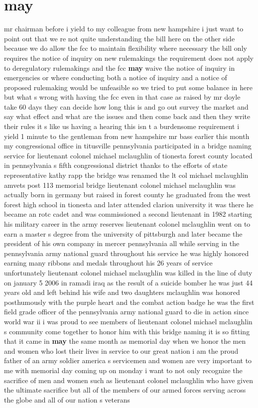 \documentclass{article}
\begin{document}
\section*{may}
mr chairman before i yield to my colleague from new hampshire i just want to point out that we re not quite understanding the bill here on the other side because we do allow the fcc to maintain flexibility where necessary the bill only requires the notice of inquiry on new rulemakings the requirement does not apply to deregulatory rulemakings and the fcc {\bf \color{red} may} waive the notice of inquiry in emergencies or where conducting both a notice of inquiry and a notice of proposed rulemaking would be unfeasible so we tried to put some balance in here but what s wrong with having the fcc even in that case as raised by mr doyle take 60 days they can decide how long this is and go out survey the market and say what effect and what are the issues and then come back and then they write their rules it s like us having a hearing this isn t a burdensome requirement i yield 1 minute to the gentleman from new hampshire mr bass
\vspace{8mm}
earlier this month my congressional office in titusville pennsylvania participated in a bridge naming service for lieutenant colonel michael mclaughlin of tionesta forest county located in pennsylvania s fifth congressional district thanks to the efforts of state representative kathy rapp the bridge was renamed the lt col michael mclaughlin amvets post 113 memorial bridge lieutenant colonel michael mclaughlin was actually born in germany but raised in forest county he graduated from the west forest high school in tionesta and later attended clarion university it was there he became an rotc cadet and was commissioned a second lieutenant in 1982 starting his military career in the army reserves lieutenant colonel mclaughlin went on to earn a master s degree from the university of pittsburgh and later became the president of his own company in mercer pennsylvania all while serving in the pennsylvania army national guard throughout his service he was highly honored earning many ribbons and medals throughout his 26 years of service unfortunately lieutenant colonel michael mclaughlin was killed in the line of duty on january 5 2006 in ramadi iraq as the result of a suicide bomber he was just 44 years old and left behind his wife and two daughters mclaughlin was honored posthumously with the purple heart and the combat action badge he was the first field grade officer of the pennsylvania army national guard to die in action since world war ii i was proud to see members of lieutenant colonel michael mclaughlin s community come together to honor him with this bridge naming it is so fitting that it came in {\bf \color{red} may} the same month as memorial day when we honor the men and women who lost their lives in service to our great nation i am the proud father of an army soldier america s servicemen and women are very important to me with memorial day coming up on monday i want to not only recognize the sacrifice of men and women such as lieutenant colonel mclaughlin who have given the ultimate sacrifice but all of the members of our armed forces serving across the globe and all of our nation s veterans
\end{document}
